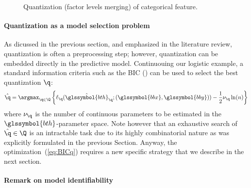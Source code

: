 \begin{figure}
\begin{multicols}{2}
\begin{minipage}{0.45\textwidth}
\caption{\label{fig:disc_disc} Quantization (factor levels merging) of categorical feature.}
\end{minipage}
\end{multicols}
\end{figure}




\paragraph{Quantization as a model selection problem} \label{par:model_selec}

As dicussed in the previous section, and emphasized in the literature review, quantization is often a preprocessing step; however, quantization can be embedded directly in the predictive model. Continuouing our logistic example, a standard information criteria such as the BIC (\cite{BIC}) can be used to select the best quantization $\q$:
\begin{equation}
    \label{eq:BICq}
    \hat{\q}=\argmax_{\q \in \Q} \left\{\ell_\q(\hat{\glssymbol{bth}}_\q ; (\glssymbol{bbx},\glssymbol{bby}))-\frac12 \nu_\q \ln (n)\right\}
\end{equation}
where $\nu_\q$ is the number of continuous parameters to be estimated in the $\glssymbol{bth}$-parameter space. Note however that an exhaustive search of $\hat{\q}\in\Q$ is an intractable task due to its highly combinatorial nature as was explicitly formulated in the previous Section. Anyway, the optimization~(\ref{eq:BICq}) requires a new specific strategy that we describe in the next section.

\paragraph{Remark on model identifiability}

